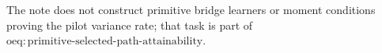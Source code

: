 The note does not construct primitive bridge learners or moment conditions proving the pilot variance rate; that task is part of \(\mathrm{oeq{:}primitive\text{-}selected\text{-}path\text{-}attainability}\).